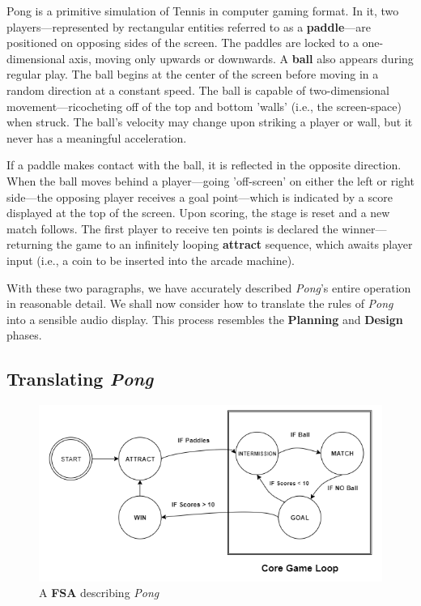 \documentclass{report}
\newcommand{\plan}{\textbf{Planning}\xspace}
\newcommand{\design}{\textbf{Design}\xspace}
\newcommand{\state}[1]{\textbf{#1}}
\newcommand{\tech}[1]{\textbf{#1}}
\begin{document}
Pong is a primitive simulation of Tennis in computer gaming format. In it, two players---represented by rectangular entities referred to as a \tech{paddle}---are positioned on opposing sides of the screen. The paddles are locked to a one-dimensional axis, moving only upwards or downwards. A \tech{ball} also appears during regular play. The ball begins at the center of the screen before moving in a random direction at a constant speed. The ball is capable of two-dimensional movement---ricocheting off of the top and bottom 'walls' (i.e., the screen-space) when struck. The ball's velocity may change upon striking a player or wall, but it never has a meaningful acceleration.

If a paddle makes contact with the ball, it is reflected in the opposite direction. When the ball moves behind a player---going 'off-screen' on either the left or right side---the opposing player receives a goal point---which is indicated by a score displayed at the top of the screen. Upon scoring, the stage is reset and a new match follows. The first player to receive ten points is declared the winner---returning the game to an infinitely looping \state{attract} sequence, which awaits player input (i.e., a coin to be inserted into the arcade machine).

With these two paragraphs, we have accurately described \emph{Pong}'s entire operation in reasonable detail. We shall now consider how to translate the rules of \emph{Pong} into a sensible audio display. This process resembles the \plan and \design phases.

\subsection{Translating \emph{Pong}}


\begin{figure}
    \includegraphics[width=\textwidth]{pongFSA.png}
    \caption{A \tech{FSA} describing \emph{Pong}}
    \label{fig:pongFSA}
\end{figure}
\end{document}
